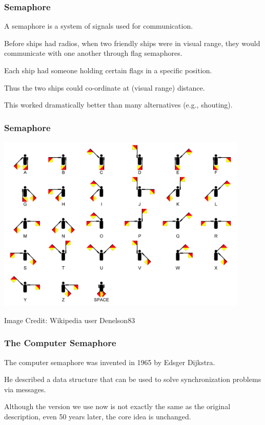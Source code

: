 \begin{frame}
	\frametitle{Semaphore}

	A semaphore is a system of signals used for communication.

	Before ships had radios, when two friendly ships were in visual range, they would communicate with one another through flag semaphores.

	Each ship had someone holding certain flags in a specific position.

	Thus the two ships could co-ordinate at (visual range) distance.

	This worked dramatically better than many alternatives (e.g., shouting).

\end{frame}


\begin{frame}
	\frametitle{Semaphore}

	\begin{center}
		\includegraphics[width=0.9\textwidth]{images/semaphore-signals.jpg}
	\end{center}
	\hfill Image Credit: Wikipedia user Denelson83

\end{frame}


\begin{frame}
	\frametitle{The Computer Semaphore}

	The computer semaphore was invented in 1965 by Edsger Dijkstra.

	He described a data structure that can be used to solve synchronization problems via messages.

	Although the version we use now is not exactly the same as the original description, even 50 years later, the core idea is unchanged.


\end{frame}

